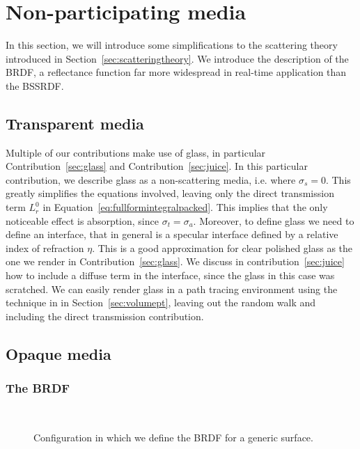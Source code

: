 \section{Non-participating media}
\label{sec:brdftheory}
In this section, we will introduce some simplifications to the scattering theory introduced in Section~\ref{sec:scatteringtheory}. We introduce the description of the BRDF, a reflectance function far more widespread in real-time application than the BSSRDF.   

\subsection{Transparent media}
\label{sec:glassdescr}
Multiple of our contributions make use of glass, in particular Contribution~\ref{sec:glass} and Contribution~\ref{sec:juice}. In this particular contribution, we describe glass as a non-scattering media, i.e. where $\sigma_s = 0$. This greatly simplifies the equations involved, leaving only the direct transmission term $L^0_r$ in Equation~\ref{eq:fullformintegralpacked}. This implies that the only noticeable effect is absorption, since $\sigma_t = \sigma_a$. Moreover, to define glass we need to define an interface, that in general is a specular interface defined by a relative index of refraction $\eta$. This is a good approximation for clear polished glass as the one we render in Contribution~\ref{sec:glass}. We discuss in contribution~\ref{sec:juice} how to include a diffuse term in the interface, since the glass in this case was scratched. We can easily render glass in a path tracing environment using the technique in in Section~\ref{sec:volumept}, leaving out the random walk and including the direct transmission contribution.

\subsection{Opaque media}
\subsubsection{The BRDF}
\label{sec:brdfsec}
\begin{figure}
\centering
   \def\svgwidth{0.9\textwidth}
    \\
\caption{Configuration in which we define the BRDF for a generic surface.} %
\label{fig:brdf_configuration}
\end{figure}

